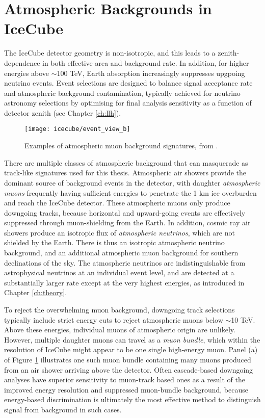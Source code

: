 \section{Atmospheric Backgrounds in IceCube}

The IceCube detector geometry is non-isotropic, and this leads to a zenith-dependence in both effective area and background rate. In addition, for higher energies above $\sim$100 TeV, Earth absorption increasingly suppresses upgpoing neutrino events. Event selections are designed to balance signal acceptance rate and atmospheric background contamination, typically achieved for neutrino astronomy selections by optimising for final analysis sensitivity as a function of detector zenith (see Chapter \ref{ch:llh}). 

\begin{figure}
	\centering \texttt{[image: icecube/event\_view\_b]}
	\caption{Examples of atmospheric muon background signatures, from \cite{kintscher_thesis}.}
	\label{fig:event_views_bkg}
\end{figure}

There are multiple classes of atmospheric background that can masquerade as track-like signatures used for this thesis. Atmospheric air showers provide the dominant source of background events in the detector, with daughter \emph{atmospheric muons} frequently having sufficient energies to penetrate the 1 km ice overburden and reach the IceCube detector. These atmospheric muons only produce downgoing tracks, because horizontal and upward-going events are effectively suppressed through muon-shielding from the Earth. In addition, cosmic ray air showers produce an isotropic flux of \emph{atmospheric neutrinos}, which are not shielded by the Earth. There is thus an isotropic atmospheric neutrino background, and an additional atmospheric muon background for southern declinations of the sky. The atmospheric neutrinos are indistinguishable from astrophysical neutrinos at an individual event level, and are detected at a substantially larger rate except at the very highest energies, as introduced in Chapter \ref{ch:theory}. 

To reject the overwhelming muon background, downgoing track selections typically include strict energy cuts to reject atmospheric muons below $\sim$10 TeV. Above these energies, individual muons of atmospheric origin are unlikely. However, multiple daughter muons can travel as a \emph{muon bundle}, which within the resolution of IceCube might appear to be one single high-energy muon. Panel (a) of Figure \ref{fig:event_views_bkg} illustrates one such muon bundle containing many muons produced from an air shower arriving above the detector. Often cascade-based downgoing analyses have superior sensitivity to muon-track based ones as a result of the improved energy resolution and suppressed muon-bundle background, because energy-based discrimination is ultimately the most effective method to distinguish signal from background in such cases.

